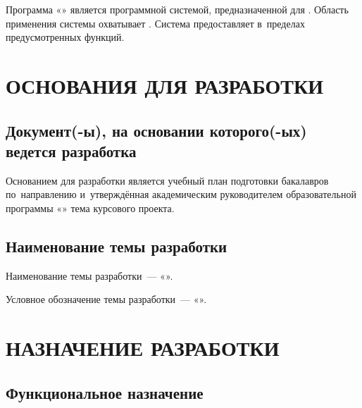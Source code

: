 \documentclass[12pt,a4paper]{extarticle}
\begin{document}
Программа «\projectname» является программной системой, предназначенной для . Область применения системы охватывает . Система предоставляет  в~пределах предусмотренных функций.

\clearpage

\section{ОСНОВАНИЯ ДЛЯ РАЗРАБОТКИ}

\subsection{Документ(-ы), на основании которого(-ых) ведется разработка}

Основанием для разработки является учебный план подготовки бакалавров по~направлению  и~утверждённая академическим руководителем образовательной программы «\hseSpecialization» тема курсового проекта.

\subsection{Наименование темы разработки}

Наименование темы разработки~--- «\projectname».

Условное обозначение темы разработки~--- «».

\clearpage

\section{НАЗНАЧЕНИЕ РАЗРАБОТКИ}

\subsection{Функциональное назначение}
\end{document}
